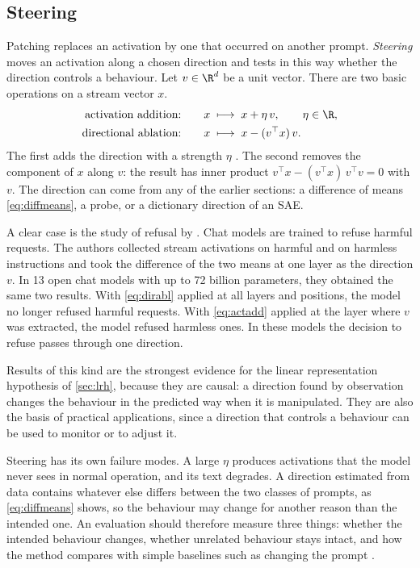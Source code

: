 \subsection{Steering}
\label{sec:steering}

Patching replaces an activation by one that occurred on another prompt. \emph{Steering} moves an activation
along a chosen direction and tests in this way whether the direction controls a behaviour. Let $v\in\R^d$ be a
unit vector. There are two basic operations on a stream vector $x$.
\begin{align}
\text{activation addition:}\qquad & x \;\longmapsto\; x+\eta\,v,\qquad \eta\in\R, \label{eq:actadd}\\
\text{directional ablation:}\qquad & x \;\longmapsto\; x-(v^\top x)\,v . \label{eq:dirabl}
\end{align}
The first adds the direction with a strength $\eta$ \citep{turner2023steering,rimsky2024steering,zou2023representation}.
The second removes the component of $x$ along $v$: the result has inner product
$v^\top x-(v^\top x)\,v^\top v=0$ with $v$. The direction can come from any of the earlier sections: a difference of
means \eqref{eq:diffmeans}, a probe, or a dictionary direction of an SAE.

A clear case is the study of refusal by \citet{arditi2024refusal}. Chat models are trained to refuse harmful
requests. The authors collected stream activations on harmful and on harmless instructions and took the
difference of the two means at one layer as the direction $v$. In 13 open chat models with up to 72 billion
parameters, they obtained the same two results. With \eqref{eq:dirabl} applied at all layers and positions, the
model no longer refused harmful requests. With \eqref{eq:actadd} applied at the layer where $v$ was extracted,
the model refused harmless ones. In these models the decision to refuse passes through one direction.

Results of this kind are the strongest evidence for the linear representation hypothesis of \cref{sec:lrh},
because they are causal: a direction found by observation changes the behaviour in the predicted way when it is
manipulated. They are also the basis of practical applications, since a direction that controls a behaviour
can be used to monitor or to adjust it.

\begin{caution}
Steering has its own failure modes. A large $\eta$ produces activations that the model never sees in normal
operation, and its text degrades. A direction estimated from data contains whatever else differs between the
two classes of prompts, as \eqref{eq:diffmeans} shows, so the behaviour may change for another reason than the
intended one. An evaluation should therefore measure three things: whether the intended behaviour changes,
whether unrelated behaviour stays intact, and how the method compares with simple baselines such as changing
the prompt \citep{wu2025axbench}.
\end{caution}

